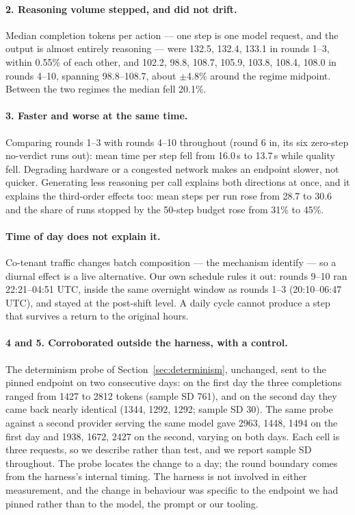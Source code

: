 \paragraph{2. Reasoning volume stepped, and did not drift.} Median completion
tokens per action --- one step is one model request, and the output is almost
entirely reasoning --- were 132.5, 132.4, 133.1 in rounds 1--3, within 0.55\%
of each other, and 102.2, 98.8, 108.7, 105.9, 103.8, 108.4, 108.0 in rounds
4--10, spanning 98.8--108.7, about $\pm$4.8\% around the regime midpoint.
Between the two regimes the median fell 20.1\%.

\paragraph{3. Faster and worse at the same time.} Comparing rounds 1--3 with
rounds 4--10 throughout (round 6 in, its six zero-step no-verdict runs out):
mean time per step fell from 16.0\,s to 13.7\,s while
quality fell. Degrading hardware or a congested network makes an endpoint
slower, not quicker. Generating less reasoning per call explains both
directions at once, and it explains the third-order effects too: mean steps per
run rose from 28.7 to 30.6 and the share of runs stopped by the 50-step budget
rose from 31\% to 45\%.

\paragraph{Time of day does not explain it.} Co-tenant traffic changes batch
composition --- the mechanism \citet{yuan2025nondeterminism} identify --- so a
diurnal effect is a live alternative. Our own schedule rules it out: rounds
9--10 ran 22:21--04:51 UTC, inside the same overnight window as rounds 1--3
(20:10--06:47 UTC), and stayed at the post-shift level. A daily cycle cannot
produce a step that survives a return to the original hours.

\paragraph{4 and 5. Corroborated outside the harness, with a control.} The
determinism probe of Section~\ref{sec:determinism}, unchanged, sent to the
pinned endpoint on two consecutive days: on the first day the three completions
ranged from 1427 to 2812 tokens (sample SD 761), and on the second day they
came back nearly identical (1344, 1292, 1292; sample SD 30). The same probe
against a second provider serving the same model gave 2963, 1448, 1494 on the
first day and 1938, 1672, 2427 on the second, varying on both days. Each cell
is three requests, so we describe rather than test, and we report sample SD
throughout. The probe locates the change to a day; the round boundary comes
from the harness's internal timing. The harness is not involved in either
measurement, and the change in behaviour was specific to the endpoint we had
pinned rather than to the model, the prompt or our tooling.

